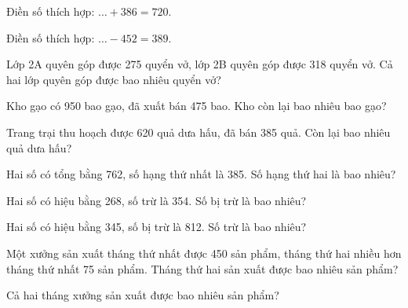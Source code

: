 \begin{ex}
Điền số thích hợp: $\dots + 386 = 720$.
\end{ex}

\begin{ex}
Điền số thích hợp: $\dots - 452 = 389$.
\end{ex}

\begin{ex}
Lớp 2A quyên góp được 275 quyển vở, lớp 2B quyên góp được 318 quyển vở. Cả hai lớp quyên góp được bao nhiêu quyển vở?
\end{ex}

\begin{ex}
Kho gạo có 950 bao gạo, đã xuất bán 475 bao. Kho còn lại bao nhiêu bao gạo?
\end{ex}

\begin{ex}
Trang trại thu hoạch được 620 quả dưa hấu, đã bán 385 quả. Còn lại bao nhiêu quả dưa hấu?
\end{ex}

\begin{ex}
Hai số có tổng bằng 762, số hạng thứ nhất là 385. Số hạng thứ hai là bao nhiêu?
\end{ex}

\begin{ex}
Hai số có hiệu bằng 268, số trừ là 354. Số bị trừ là bao nhiêu?
\end{ex}

\begin{ex}
Hai số có hiệu bằng 345, số bị trừ là 812. Số trừ là bao nhiêu?
\end{ex}

\begin{ex}
Một xưởng sản xuất tháng thứ nhất được 450 sản phẩm, tháng thứ hai nhiều hơn tháng thứ nhất 75 sản phẩm. Tháng thứ hai sản xuất được bao nhiêu sản phẩm?
\end{ex}

\begin{ex}
Cả hai tháng xưởng sản xuất được bao nhiêu sản phẩm?
\end{ex}

